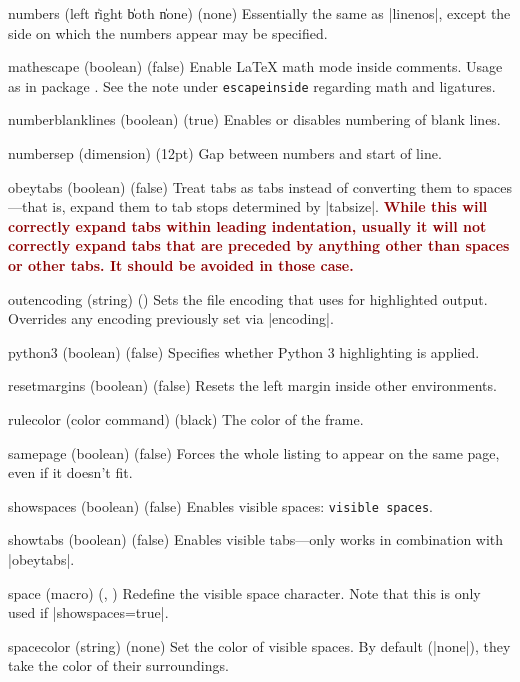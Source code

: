 \begin{optionlist}
  \item[numbers (left \| right \| both \| none) (none)]
    Essentially the same as |linenos|, except the side on which the numbers appear may be specified.
  \item[mathescape (boolean) (false)]
    Enable \LaTeX{} math mode inside comments.
    Usage as in package .
    See the note under \texttt{escapeinside} regarding math and ligatures.
  \item[numberblanklines (boolean) (true)]
    Enables or disables numbering of blank lines.
  \item[numbersep (dimension) (12pt)]
    Gap between numbers and start of line.
  \item[obeytabs (boolean) (false)]
    Treat tabs as tabs instead of converting them to spaces---that is, expand them to tab stops determined by |tabsize|.  \textcolor{DarkRed}{\textbf{While this will correctly expand tabs within leading indentation, usually it will not correctly expand tabs that are preceded by anything other than spaces or other tabs.  It should be avoided in those case.}}

  \item[outencoding (string) (\meta{system-specific})]
    Sets the file encoding that  uses for highlighted output.  Overrides any encoding previously set via |encoding|.
  \item[python3 (boolean) (false)] 
    Specifies whether Python 3 highlighting is applied.
  \item[resetmargins (boolean) (false)]
    Resets the left margin inside other environments.
  \item[rulecolor (color command) (black)]
    The color of the frame.
  \item[samepage (boolean) (false)]
    Forces the whole listing to appear on the same page, even if it doesn't fit.
  \item[showspaces (boolean) (false)]
    Enables visible spaces: \verb*/visible spaces/.
  \item[showtabs (boolean) (false)]
    Enables visible tabs---only works in combination with |obeytabs|.


\item[space (macro) (\string\textvisiblespace, \textvisiblespace)]
Redefine the visible space character.  Note that this is only used if |showspaces=true|.


\item[spacecolor (string) (none)]
Set the color of visible spaces.  By default (|none|), they take the color of their surroundings.



\end{optionlist}
